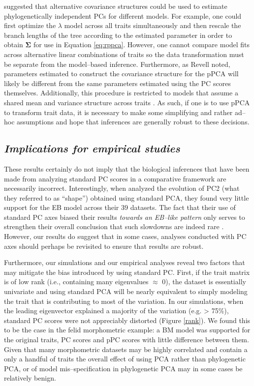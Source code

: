\documentclass[a4paper,12pt]{article}
\begin{document}
\cite{Revell2008} suggested that alternative covariance structures could be used to estimate phylogenetically independent PCs for different models. For example, one could first optimize the $\lambda$ model \citep{Pagel1999} across all traits simultaneously and then rescale the branch lengths of the tree according to the estimated parameter in order to obtain $\mathbf{\Sigma}$ for use in Equation \ref{eq:rppca}. However, one cannot compare model fits across alternative linear combinations of traits so the data transformation must be separate from the model--based inference.  Furthermore, as Revell noted, parameters estimated to construct the covariance structure for the pPCA will likely be different from the same parameters estimated using the PC scores themselves. Additionally, this procedure is restricted to models that assume a shared mean and variance structure across traits \citep[see][for examples where this does not apply]{Hansen2008, Bartoszek2012}. As such, if one is to use pPCA to transform trait data, it is necessary to make some simplifying and rather ad--hoc assumptions and hope that inferences are generally robust to these decisions.

\subsection{\emph{Implications for empirical studies}}
These results certainly do not imply that the biological inferences that have been made from analyzing standard PC scores in a comparative framework are necessarily incorrect. Interestingly, when \citet{Harmon2010} analyzed the evolution of PC2 (what they referred to as ``shape'') obtained using standard PCA, they found very little support for the EB model across their 39 datasets. The fact that their use of standard PC axes biased their results \emph{towards an EB--like pattern} only serves to strengthen their overall conclusion that such slowdowns are indeed rare \citep[but see][]{SlaterPennell}. However, our results do suggest that in some cases, analyses conducted with PC axes should perhaps be revisited to ensure that results are robust.

Furthermore, our simulations and our empirical analyses reveal two factors that may mitigate the bias introduced by using standard PC. First, if the trait matrix
is of low rank (i.e., containing many eigenvalues $\approx$ 0), the dataset is essentially univariate and using standard PCA will be nearly equivalent to simply modeling the trait that is contributing to most of the variation. In our simulations, when the leading eigenvector explained a majority of the variation (e.g. > 75\%), standard PC scores were not appreciably distorted (Figure \ref{rank}). We found this to be the case in the felid morphometric example: a BM model was supported for the original traits, PC scores and pPC scores with little difference between them. Given that many morphometric datasets may be highly correlated and contain a only a handful of traits the overall effect of using PCA rather than phylogenetic PCA, or of model mis--specification in phylogenetic PCA may in some cases be relatively benign.
\end{document}
